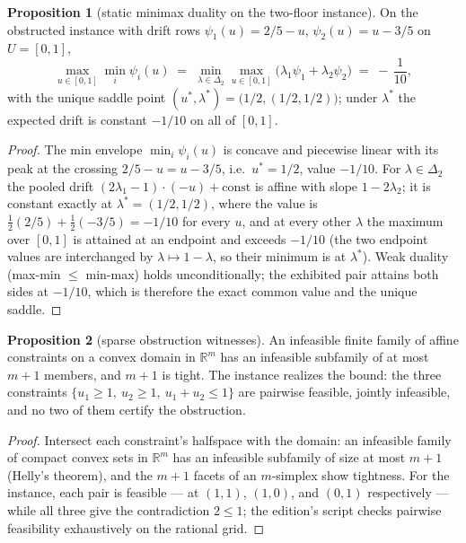 \documentclass[10pt,twocolumn]{article}
\theoremstyle{definition}
\newtheorem{proposition}{Proposition}
\begin{document}
\begin{proposition}[static minimax duality on the two-floor instance]
\label{prop:saddle}
On the obstructed instance with drift rows \(\psi_1(u) = 2/5 - u\),
\(\psi_2(u) = u - 3/5\) on \(U = [0,1]\),
\[
\max_{u \in [0,1]} \min_i \psi_i(u) \;=\;
\min_{\lambda \in \Delta_2} \max_{u \in [0,1]}
\bigl(\lambda_1 \psi_1 + \lambda_2 \psi_2\bigr) \;=\; -\,\frac{1}{10},
\]
with the unique saddle point \((u^{*}, \lambda^{*}) = \bigl(1/2,
(1/2, 1/2)\bigr)\); under \(\lambda^{*}\) the expected drift is
constant \(-1/10\) on all of \([0,1]\).
\end{proposition}

\begin{proof}
The min envelope \(\min_i \psi_i(u)\) is concave and piecewise
linear with its peak at the crossing \(2/5 - u = u - 3/5\), i.e.\
\(u^{*} = 1/2\), value \(-1/10\). For \(\lambda \in \Delta_2\)
the pooled drift \((2\lambda_1 - 1)\cdot(-u) + \text{const}\) is
affine with slope \(1 - 2\lambda_2\); it is constant exactly at
\(\lambda^{*} = (1/2, 1/2)\), where the value is
\(\tfrac12(2/5) + \tfrac12(-3/5) = -1/10\) for every \(u\), and at
every other \(\lambda\) the maximum over \([0,1]\) is attained at an
endpoint and exceeds \(-1/10\) (the two endpoint values are
interchanged by \(\lambda \mapsto 1 - \lambda\), so their minimum
is at \(\lambda^{*}\)). Weak duality (max-min \(\le\) min-max)
holds unconditionally; the exhibited pair attains both sides at
\(-1/10\), which is therefore the exact common value and the unique
saddle.
\end{proof}

\begin{proposition}[sparse obstruction witnesses]\label{prop:helly}
An infeasible finite family of affine constraints on a convex domain in
\(\mathbb{R}^m\) has an infeasible subfamily of at most \(m + 1\)
members, and \(m + 1\) is tight. The instance realizes the bound: the
three constraints \(\{u_1 \ge 1,\ u_2 \ge 1,\ u_1 + u_2 \le 1\}\)
are pairwise feasible, jointly infeasible, and no two of them certify
the obstruction.
\end{proposition}

\begin{proof}
Intersect each constraint's halfspace with the domain: an infeasible
family of compact convex sets in \(\mathbb{R}^m\) has an infeasible
subfamily of size at most \(m + 1\) (Helly's theorem), and the
\(m + 1\) facets of an \(m\)-simplex show tightness. For the
instance, each pair is feasible --- at \((1,1)\), \((1,0)\), and
\((0,1)\) respectively --- while all three give the contradiction
\(2 \le 1\); the edition's script checks pairwise feasibility
exhaustively on the rational grid.
\end{proof}
\end{document}
